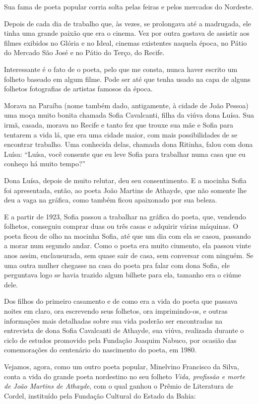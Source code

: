 Sua fama de poeta popular corria solta pelas feiras e
pelos mercados do Nordeste.

Depois de cada dia de trabalho que, às vezes, se prolongava
até a madrugada, ele tinha uma grande paixão que era o
cinema. Vez por outra gostava de assistir aos filmes exibidos
no Glória e no Ideal, cinemas existentes naquela época, no
Pátio do Mercado São José e no Pátio do Terço, do Recife.

Interessante é o fato de o poeta, pelo que me consta,
nunca haver escrito um folheto baseado em algum filme.
Pode ser até que tenha usado na capa de alguns folhetos
fotografias de artistas famosos da época.

Morava na Paraíba (nome também dado, antigamente,
à cidade de João Pessoa) uma moça muito bonita chamada
Sofia Cavalcanti, filha da viúva dona Luísa. Sua irmã,
casada, morava no Recife e tanto fez que trouxe sua mãe e
Sofia para tentarem a vida lá, que era uma cidade maior,
com mais possibilidades de se encontrar trabalho. Uma
conhecida delas, chamada dona Ritinha, falou com dona
Luísa: ``Luísa, você consente que eu leve Sofia para
trabalhar numa casa que eu conheço há muito tempo?''

Dona Luísa, depois de muito relutar, deu seu
consentimento. E a mocinha Sofia foi apresentada, então,
ao poeta João Martins de Athayde, que não somente lhe
deu a vaga na gráfica, como também ficou apaixonado por
sua beleza.

E a partir de 1923, Sofia passou a trabalhar na gráfica
do poeta, que, vendendo folhetos, conseguiu comprar duas
ou três casas e adquirir várias máquinas. O poeta ficou de
olho na mocinha Sofia, até que um dia com ela se casou,
passando a morar num segundo andar. Como o poeta era
muito ciumento, ela passou vinte anos assim, enclausurada,
sem quase sair de casa, sem conversar com ninguém. Se
uma outra mulher chegasse na casa do poeta pra falar com
dona Sofia, ele perguntava logo se havia trazido algum
bilhete para ela, tamanho era o ciúme dele.

Dos filhos do primeiro casamento e de como era a vida
do poeta que passava noites em claro, ora escrevendo seus
folhetos, ora imprimindo-os, e outras informações mais
detalhadas sobre sua vida poderão ser encontradas na
entrevista de dona Sofia Cavalcanti de Athayde, sua viúva, 
realizada durante o ciclo de estudos promovido pela
Fundação Joaquim Nabuco, por ocasião das comemorações
do centenário do nascimento do poeta, em 1980.

Vejamos, agora, como um outro poeta popular,
Minelvino Francisco da Silva, conta a vida do grande poeta
nordestino no seu folheto \textit{Vida, profissão e morte de João
Martins de Athayde}, com o qual ganhou o Prêmio de
Literatura de Cordel, instituído pela Fundação Cultural
do Estado da Bahia:

